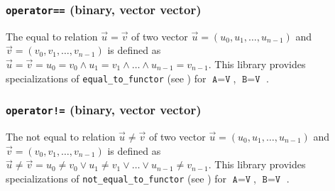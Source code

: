 \subsubsection{\texttt{operator==} (binary, vector vector)}
The equal to relation $\vec{u} = \vec{v}$ of two vector $\vec{u}=\left(u_0,u_1,\ldots,u_{n-1}\right)$
and $\vec{v}=\left(v_0,v_1,\ldots,v_{n-1}\right)$ is defined as $\vec{u} = \vec{v} = u_0 = v_0
\wedge u_1 = v_1 \wedge \ldots \wedge u_{n-1} = v_{n-1}$.
%
This library provides specializations of \texttt{equal\_to\_functor} (see \cite{relationalfunctors})
for $\texttt{A}=\texttt{V}$, $\texttt{B}=\texttt{V}$ \ForAllVectors.

\subsubsection{\texttt{operator!=} (binary, vector vector)}
The not equal to relation $\vec{u} \neq \vec{v}$ of two vector $\vec{u}=\left(u_0,u_1,\ldots,u_{n-1}\right)$
and $\vec{v}=\left(v_0,v_1,\ldots,v_{n-1}\right)$ is defined as $\vec{u} \neq \vec{v} = u_0 \neq v_0
\vee u_1 \neq v_1 \vee \ldots \vee u_{n-1} \neq v_{n-1}$.
%
This library provides specializations of \texttt{not\_equal\_to\_functor} (see \cite{relationalfunctors})
for $\texttt{A}=\texttt{V}$, $\texttt{B}=\texttt{V}$ \ForAllVectors.